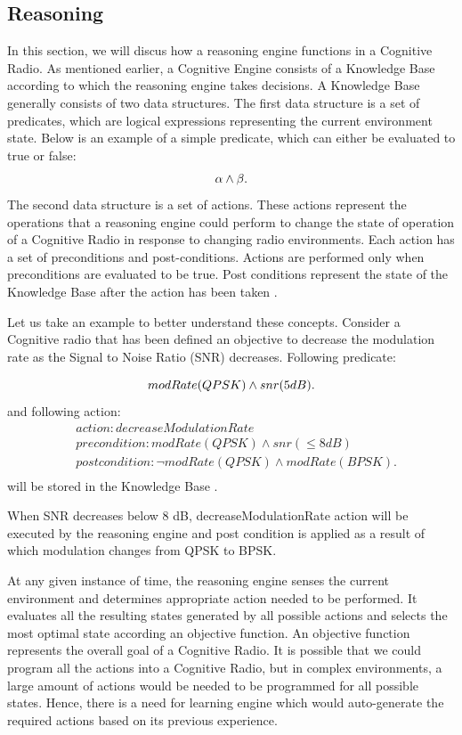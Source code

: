 \documentclass[conference]{IEEEtran}
\begin{document}
\subsection{Reasoning}
In this section, we will discus how a reasoning engine functions in a Cognitive Radio. As mentioned earlier, a Cognitive Engine consists of a Knowledge Base according to which the reasoning engine takes decisions. A Knowledge Base generally consists of two data structures. The first data structure is a set of predicates, which are logical expressions representing the current environment state. Below is an example of a simple predicate, which can either be evaluated to true or false:
\begin{equation}
\centering
\label{A predicate}
\alpha  \wedge  \beta.
\end{equation}
The second data structure is a set of actions. These actions represent the operations that a reasoning engine could perform to change the state of operation of a Cognitive Radio in response to changing radio environments. Each action has a set of preconditions and post-conditions. Actions are performed only when preconditions are evaluated to be true. Post conditions represent the state of the Knowledge Base after the action has been taken \cite{4}.
	
	Let us take an example to better understand these concepts. Consider a Cognitive radio that has been defined an objective to decrease the modulation rate as the Signal to Noise Ratio (SNR) decreases. Following predicate: 
	
\begin{equation}
\centering
modRate(QPSK) \wedge snr(5 dB).
\end{equation}
and following action:
\begin{equation}
\begin{split}
& action:decreaseModulationRate  \\
& precondition:modRate(QPSK) \wedge snr(\leq8dB) \\
& postcondition:\neg modRate(QPSK)	 \wedge modRate(BPSK). \\
\end{split}
\end{equation}
will be stored in the Knowledge Base \cite{4}.

When SNR decreases below 8 dB, decreaseModulationRate action will be executed by the reasoning engine and post condition is applied as a result of which modulation changes from QPSK to BPSK.

	At any given instance of time, the reasoning engine senses the current environment and determines appropriate action needed to be performed. It evaluates all the resulting states generated by all possible actions and selects the most optimal state according an objective function. An objective function represents the overall goal of a Cognitive Radio. It is possible that we could program all the actions into a Cognitive Radio, but in complex environments, a large amount of actions would be needed to be programmed for all possible states. Hence, there is a need for learning engine which would auto-generate the required actions based on its previous experience.
\end{document}
